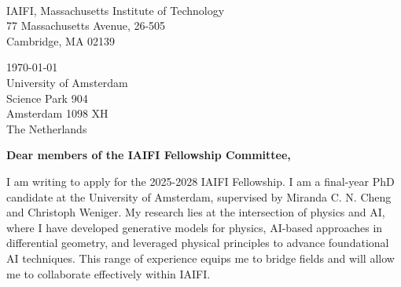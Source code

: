 \documentclass[11pt]{article}
\title{}
\author{}
\date{}
\begin{document}
\thispagestyle{firstpagestyle}

\noindent
\begin{minipage}[t]{0.5\textwidth}
\phantom{
\today \\
}
\vspace{0.25cm} \\
IAIFI, Massachusetts Institute of Technology \\
77 Massachusetts Avenue, 26-505 \\
Cambridge, MA 02139 \\

\end{minipage}
\begin{minipage}[t]{0.5\textwidth}
\flushright
\today \\
\vspace{0.25cm}
University of Amsterdam \\
Science Park 904 \\
Amsterdam 1098 XH \\
The Netherlands \\
\end{minipage}

\vspace{20pt}

\noindent
\textbf{Dear members of the IAIFI Fellowship Committee,}

I am writing to apply for the 2025-2028 IAIFI Fellowship. I am a final-year PhD candidate at the University of Amsterdam, supervised by Miranda C. N. Cheng and Christoph Weniger. My research lies at the intersection of physics and AI, where I have developed generative models for physics, AI-based approaches in differential geometry, and leveraged physical principles to advance foundational AI techniques.
This range of experience equips me to bridge fields and will allow me to collaborate effectively within IAIFI.
\end{document}
